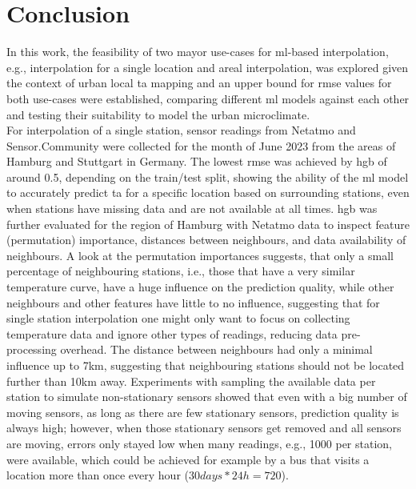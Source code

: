 \chapter{Conclusion}
\label{chap:Conclusion}

In this work, the feasibility of two mayor use-cases for \gls{ml}-based interpolation, e.g., interpolation for a single location and areal interpolation, was explored given the context of urban local \gls{ta} mapping and an upper bound for \gls{rmse} values for both use-cases were established, comparing different \gls{ml} models against each other and testing their suitability to model the urban microclimate.\\
For interpolation of a single station, sensor readings from Netatmo and Sensor.Community were collected for the month of June 2023 from the areas of Hamburg and Stuttgart in Germany. The lowest \gls{rmse} was achieved by \gls{hgb} of around 0.5, depending on the train/test split, showing the ability of the \gls{ml} model to accurately predict \gls{ta} for a specific location based on surrounding stations, even when stations have missing data and are not available at all times. \gls{hgb} was further evaluated for the region of Hamburg with Netatmo data to inspect feature (permutation) importance, distances between neighbours, and data availability of neighbours. A look at the permutation importances suggests, that only a small percentage of neighbouring stations, i.e., those that have a very similar temperature curve, have a huge influence on the prediction quality, while other neighbours and other features have little to no influence, suggesting that for single station interpolation one might only want to focus on collecting temperature data and ignore other types of readings, reducing data pre-processing overhead. The distance between neighbours had only a minimal influence up to 7km, suggesting that neighbouring stations should not be located further than 10km away. Experiments with sampling the available data per station to simulate non-stationary sensors showed that even with a big number of moving sensors, as long as there are few stationary sensors, prediction quality is always high; however, when those stationary sensors get removed and all sensors are moving, errors only stayed low when many readings, e.g., 1000 per station, were available, which could be achieved for example by a bus that visits a location more than once every hour ($30 days * 24h = 720$). \\
